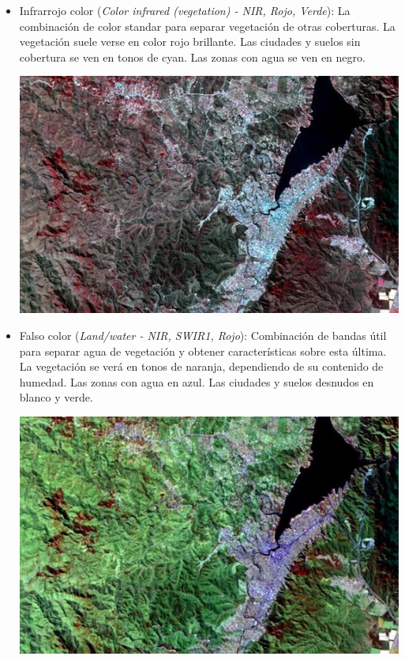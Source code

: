 \documentclass[a4paper,12pt]{book}
\begin{document}
\begin{itemize}
    \item Infrarrojo color (\emph{Color infrared (vegetation) - NIR, Rojo, Verde}): La combinación de color standar para separar vegetación de otras coberturas. La vegetación suele verse en color rojo brillante. Las ciudades y suelos sin cobertura se ven en tonos de cyan. Las zonas con agua se ven en negro.
    \begin{center}\includegraphics[scale=0.3]{8-4-3.jpeg}\end{center}
    \item Falso color (\emph{Land/water - NIR, SWIR1, Rojo}): Combinación de bandas útil para separar agua de vegetación y obtener características sobre esta última. La vegetación se verá en tonos de naranja, dependiendo de su contenido de humedad. Las zonas con agua en azul. Las ciudades y suelos desnudos en blanco y verde.
    \begin{center}\includegraphics[scale=0.3]{8-11-4.jpeg}\end{center}
\end{itemize}
\end{document}
